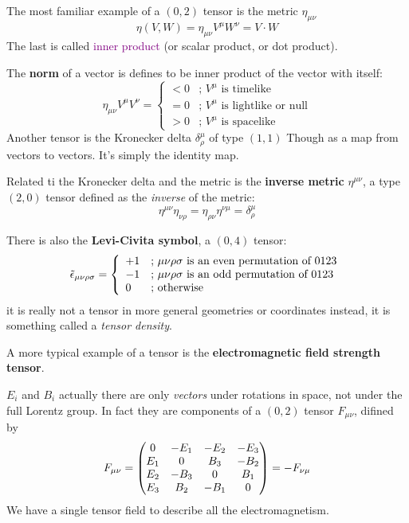 The most familiar example of a $(0,2)$ tensor is the metric $\eta_{\mu\nu}$
\begin{equation*}
    \eta(V,W)=\eta_{\mu\nu}V^\mu W^\nu=V\cdot W
\end{equation*}
The last is called \textcolor{purple}{inner product} (or scalar product, or dot product).

The \textbf{norm} of a vector is defines to be inner product of the vector with itself:
\begin{equation*}
    \eta_{\mu\nu}V^\mu V^\nu= \left\{ \begin{array}{ll}
             <0 &  \text{; $V^\mu$ is timelike} \\
             =0 &  \text{; $V^\mu$ is lightlike or null} \\
             >0 &  \text{; $V^\mu$ is spacelike}
             \end{array}
   \right.
\end{equation*}
Another tensor is the Kronecker delta $\delta^\mu_\rho$ of type $(1,1)$ Though as a map from vectors to vectors. It's simply the identity map.

Related ti the Kronecker delta and the metric is the \textbf{inverse metric} $\eta^{\mu\nu}$, a type $(2,0)$ tensor defined as the \textit{inverse} of the metric:
\begin{equation*}
    \eta^{\mu\nu}\eta_{\nu\rho}=\eta_{\rho\nu}\eta^{\nu\mu}=\delta^\mu_\rho
\end{equation*}

There is also the \textbf{Levi-Civita symbol}, a $(0,4)$ tensor:
\begin{equation*}
    \Tilde{\epsilon}_{\mu\nu\rho\sigma}= \left\{ \begin{array}{ll}
             +1 &  \text{; $\mu\nu\rho\sigma$ is an even permutation of $0123$} \\
             -1 &  \text{; $\mu\nu\rho\sigma$ is an odd permutation of $0123$} \\
              0 &  \text{; otherwise}
             \end{array}
   \right.
\end{equation*}
it is really not a tensor in more general geometries or coordinates instead, it is something called a \textit{tensor density}.

A more typical example of a tensor is the \textbf{electromagnetic field strength tensor}.

$E_i$ and $B_i$ actually there are only \textit{vectors} under rotations in space, not under the full Lorentz group. In fact they are components of a $(0,2)$ tensor $F_{\mu\nu}$, difined by
\begin{equation}\label{1eq:F}
    F_{\mu\nu}=\mqty(0&-E_1&-E_2&-E_3\\E_1&0&B_3&-B_2\\E_2&-B_3&0&B_1\\E_3&B_2&-B_1&0)=-F_{\nu\mu}
\end{equation}
We have a single tensor field to describe all the electromagnetism.

